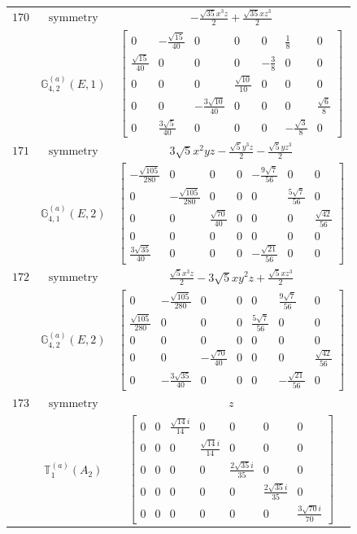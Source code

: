 \documentclass[fleqn,8pt,landscape]{jsarticle}
\begin{document}
\begin{longtable}{ccc}
$ 170 $ & $ \text{symmetry} $ & $ - \frac{\sqrt{35} x^{3} z}{2} + \frac{\sqrt{35} x z^{3}}{2} $ \\
$  $ & $ \mathbb{G}_{4,2}^{(a)}(E,1) $ & $ \begin{bmatrix} 0 & - \frac{\sqrt{15}}{40} & 0 & 0 & 0 & \frac{1}{8} & 0 \\ \frac{\sqrt{15}}{40} & 0 & 0 & 0 & - \frac{3}{8} & 0 & 0 \\ 0 & 0 & 0 & \frac{\sqrt{10}}{10} & 0 & 0 & 0 \\ 0 & 0 & - \frac{3 \sqrt{10}}{40} & 0 & 0 & 0 & \frac{\sqrt{6}}{8} \\ 0 & \frac{3 \sqrt{5}}{40} & 0 & 0 & 0 & - \frac{\sqrt{3}}{8} & 0 \end{bmatrix} $ \\ \hline
$ 171 $ & $ \text{symmetry} $ & $ 3 \sqrt{5} x^{2} y z - \frac{\sqrt{5} y^{3} z}{2} - \frac{\sqrt{5} y z^{3}}{2} $ \\
$  $ & $ \mathbb{G}_{4,1}^{(a)}(E,2) $ & $ \begin{bmatrix} - \frac{\sqrt{105}}{280} & 0 & 0 & 0 & - \frac{9 \sqrt{7}}{56} & 0 & 0 \\ 0 & - \frac{\sqrt{105}}{280} & 0 & 0 & 0 & \frac{5 \sqrt{7}}{56} & 0 \\ 0 & 0 & \frac{\sqrt{70}}{40} & 0 & 0 & 0 & \frac{\sqrt{42}}{56} \\ 0 & 0 & 0 & 0 & 0 & 0 & 0 \\ \frac{3 \sqrt{35}}{40} & 0 & 0 & 0 & - \frac{\sqrt{21}}{56} & 0 & 0 \end{bmatrix} $ \\ \hline
$ 172 $ & $ \text{symmetry} $ & $ \frac{\sqrt{5} x^{3} z}{2} - 3 \sqrt{5} x y^{2} z + \frac{\sqrt{5} x z^{3}}{2} $ \\
$  $ & $ \mathbb{G}_{4,2}^{(a)}(E,2) $ & $ \begin{bmatrix} 0 & - \frac{\sqrt{105}}{280} & 0 & 0 & 0 & \frac{9 \sqrt{7}}{56} & 0 \\ \frac{\sqrt{105}}{280} & 0 & 0 & 0 & \frac{5 \sqrt{7}}{56} & 0 & 0 \\ 0 & 0 & 0 & 0 & 0 & 0 & 0 \\ 0 & 0 & - \frac{\sqrt{70}}{40} & 0 & 0 & 0 & \frac{\sqrt{42}}{56} \\ 0 & - \frac{3 \sqrt{35}}{40} & 0 & 0 & 0 & - \frac{\sqrt{21}}{56} & 0 \end{bmatrix} $ \\ \hline
$ 173 $ & $ \text{symmetry} $ & $ z $ \\
$  $ & $ \mathbb{T}_{1}^{(a)}(A_{2}) $ & $ \begin{bmatrix} 0 & 0 & \frac{\sqrt{14} i}{14} & 0 & 0 & 0 & 0 \\ 0 & 0 & 0 & \frac{\sqrt{14} i}{14} & 0 & 0 & 0 \\ 0 & 0 & 0 & 0 & \frac{2 \sqrt{35} i}{35} & 0 & 0 \\ 0 & 0 & 0 & 0 & 0 & \frac{2 \sqrt{35} i}{35} & 0 \\ 0 & 0 & 0 & 0 & 0 & 0 & \frac{3 \sqrt{70} i}{70} \end{bmatrix} $ \\ \hline

\end{longtable}
\end{document}
